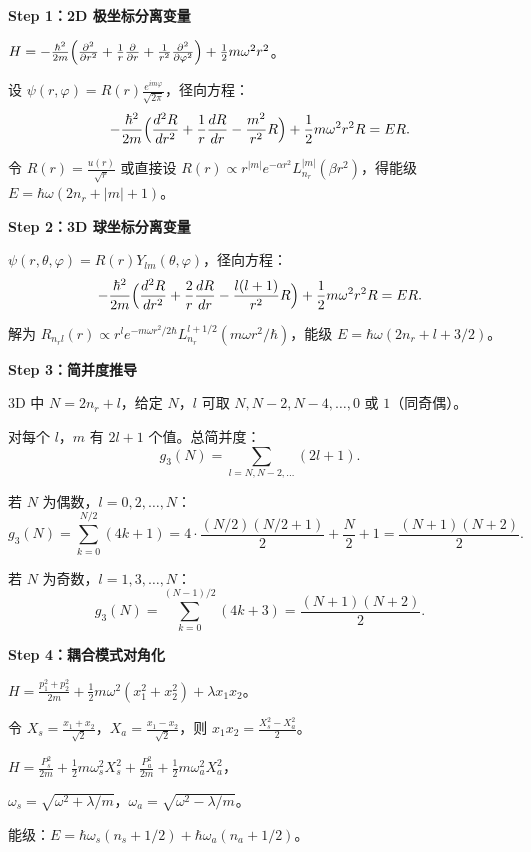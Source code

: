 \begin{derivationbox}
\textbf{Step 1：2D 极坐标分离变量}

$H=-\frac{\hbar^2}{2m}\Bigl(\frac{\partial^2}{\partial r^2}+\frac1r\frac{\partial}{\partial r}+\frac1{r^2}\frac{\partial^2}{\partial\varphi^2}\Bigr)+\frac12m\omega^2r^2$。

设 $\psi(r,\varphi)=R(r)\frac{e^{im\varphi}}{\sqrt{2\pi}}$，径向方程：
\[
-\frac{\hbar^2}{2m}\Bigl(\frac{d^2R}{dr^2}+\frac1r\frac{dR}{dr}-\frac{m^2}{r^2}R\Bigr)+\frac12m\omega^2r^2R=ER.
\]

令 $R(r)=\frac{u(r)}{\sqrt{r}}$ 或直接设 $R(r)\propto r^{|m|}e^{-\alpha r^2}L_{n_r}^{|m|}(\beta r^2)$，得能级 $E=\hbar\omega(2n_r+|m|+1)$。

\textbf{Step 2：3D 球坐标分离变量}

$\psi(r,\theta,\varphi)=R(r)Y_{lm}(\theta,\varphi)$，径向方程：
\[
-\frac{\hbar^2}{2m}\Bigl(\frac{d^2R}{dr^2}+\frac2r\frac{dR}{dr}-\frac{l(l+1)}{r^2}R\Bigr)+\frac12m\omega^2r^2R=ER.
\]

解为 $R_{n_rl}(r)\propto r^l e^{-m\omega r^2/2\hbar}L_{n_r}^{l+1/2}(m\omega r^2/\hbar)$，能级 $E=\hbar\omega(2n_r+l+3/2)$。

\textbf{Step 3：简并度推导}

3D 中 $N=2n_r+l$，给定 $N$，$l$ 可取 $N,N-2,N-4,\ldots,0$ 或 $1$（同奇偶）。

对每个 $l$，$m$ 有 $2l+1$ 个值。总简并度：
\[
g_3(N)=\sum_{l=N,N-2,\ldots}(2l+1).
\]

若 $N$ 为偶数，$l=0,2,\ldots,N$：
\[
g_3(N)=\sum_{k=0}^{N/2}(4k+1)=4\cdot\frac{(N/2)(N/2+1)}{2}+\frac{N}{2}+1=\frac{(N+1)(N+2)}{2}.
\]

若 $N$ 为奇数，$l=1,3,\ldots,N$：
\[
g_3(N)=\sum_{k=0}^{(N-1)/2}(4k+3)=\frac{(N+1)(N+2)}{2}.
\]

\textbf{Step 4：耦合模式对角化}

$H=\frac{p_1^2+p_2^2}{2m}+\frac12m\omega^2(x_1^2+x_2^2)+\lambda x_1x_2$。

令 $X_s=\frac{x_1+x_2}{\sqrt2}$，$X_a=\frac{x_1-x_2}{\sqrt2}$，则 $x_1x_2=\frac{X_s^2-X_a^2}{2}$。

$H=\frac{P_s^2}{2m}+\frac12m\omega_s^2X_s^2+\frac{P_a^2}{2m}+\frac12m\omega_a^2X_a^2$，

$\omega_s=\sqrt{\omega^2+\lambda/m}$，$\omega_a=\sqrt{\omega^2-\lambda/m}$。

能级：$E=\hbar\omega_s(n_s+1/2)+\hbar\omega_a(n_a+1/2)$。
\end{derivationbox}

\vspace{1em}
